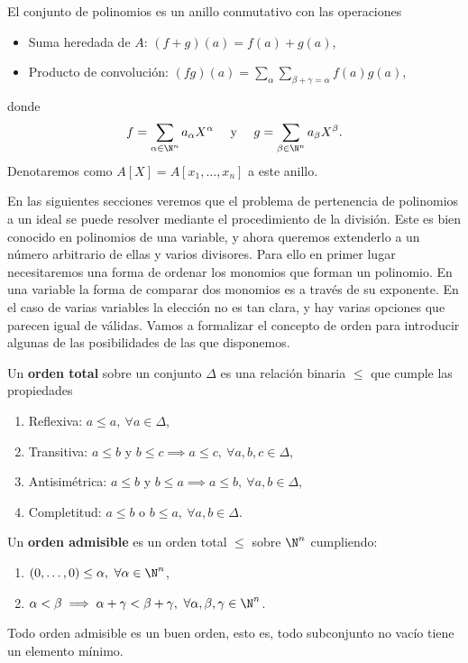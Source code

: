 \begin{proposicion}
    El conjunto de polinomios es un anillo conmutativo con las operaciones
    \begin{itemize}
        \item Suma heredada de $A$: $(f+g)(a) = f(a) + g(a)$,
        \item Producto de convolución: $(fg)(a) = \sum_{\alpha} \sum_{\beta+\gamma=\alpha} f(a)g(a)$,
    \end{itemize}

    donde 
    $$ f = \sum_{\alpha\in \N^n} a_{\alpha} X^{\alpha}\quad \text{ y }\quad g = \sum_{\beta\in \N^n} a_{\beta} X^{\beta}.$$ 
    Denotaremos como  $A[X] = A[x_1,\dots, x_n]$ a este anillo.
\end{proposicion}

En las siguientes secciones veremos que el problema de pertenencia de polinomios a un ideal se puede resolver mediante el procedimiento de la división. Este es bien conocido en polinomios de una variable, y ahora queremos extenderlo a un número arbitrario de ellas y varios divisores. Para ello en primer lugar necesitaremos una forma de ordenar los monomios que forman un polinomio. En una variable la forma  de comparar dos monomios es a través de su exponente. En el caso de varias variables la elección no es tan clara, y hay varias opciones que parecen igual de válidas. Vamos a formalizar el concepto de orden para introducir algunas de las posibilidades de las que disponemos. 

\begin{definicion}
    Un \textbf{orden total} sobre un conjunto $\Delta$ es una relación binaria $\le$ que cumple las propiedades
    \begin{enumerate}
        \item Reflexiva: $a\le a,\ \forall a\in \Delta$,
        \item Transitiva: $a\le b$ y $b\le c \implies a\le c,\ \forall a,b,c\in \Delta$,
        \item Antisimétrica:  $a\le b$ y $b\le a \implies a\le b,\ \forall a,b\in \Delta$,
        \item Completitud: $a\le b$ o $b\le a,\ \forall a,b\in \Delta$.
    \end{enumerate}
\end{definicion}
\begin{definicion}
    Un \textbf{orden admisible} es un orden total $\le$ sobre $\N^n$ cumpliendo:
    \begin{enumerate}
        \item $(0,\dots ,0) \le \alpha,\ \forall \alpha \in \N^n$,
        \item $\alpha < \beta \implies \alpha + \gamma < \beta + \gamma,\ \forall \alpha,\beta,\gamma \in \N^n$.
    \end{enumerate}
\end{definicion}
\begin{proposicion}
    Todo orden admisible es un buen orden, esto es, todo subconjunto no vacío tiene un elemento mínimo.
\end{proposicion}

